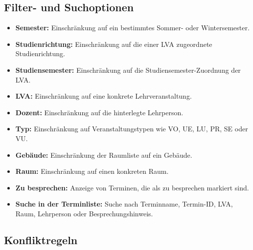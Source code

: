 \documentclass[12pt,a4paper]{article}
\begin{document}
\subsection{Filter- und Suchoptionen}

\begin{itemize}
\item \textbf{Semester:} Einschränkung auf ein bestimmtes Sommer- oder Wintersemester.
\item \textbf{Studienrichtung:} Einschränkung auf die einer LVA zugeordnete Studienrichtung.
\item \textbf{Studiensemester:} Einschränkung auf die Studiensemester-Zuordnung der LVA.
\item \textbf{LVA:} Einschränkung auf eine konkrete Lehrveranstaltung.
\item \textbf{Dozent:} Einschränkung auf die hinterlegte Lehrperson.
\item \textbf{Typ:} Einschränkung auf Veranstaltungstypen wie VO, UE, LU, PR, SE oder VU.
\item \textbf{Gebäude:} Einschränkung der Raumliste auf ein Gebäude.
\item \textbf{Raum:} Einschränkung auf einen konkreten Raum.
\item \textbf{Zu besprechen:} Anzeige von Terminen, die als zu besprechen markiert sind.
\item \textbf{Suche in der Terminliste:} Suche nach Terminname, Termin-ID, LVA, Raum, Lehrperson oder Besprechungshinweis.
\end{itemize}

\subsection{Konfliktregeln}
\end{document}

